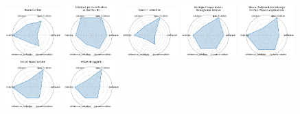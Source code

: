 \begin{figure}[ht!]
\centering
\includegraphics[width=0.1900\textwidth]{images/beam_control_radar.pdf}
\includegraphics[width=0.1900\textwidth]{images/ultrafast_jet_classification_at_the_hl-lhc_radar.pdf}
\includegraphics[width=0.1900\textwidth]{images/quench_detection_radar.pdf}
\includegraphics[width=0.1900\textwidth]{images/intelligent_experiments_through_real-time_ai_radar.pdf}
\includegraphics[width=0.1900\textwidth]{images/neural_architecture_codesign_for_fast_physics_applications_radar.pdf}
\\[1ex]
\includegraphics[width=0.1900\textwidth]{images/smart_pixels_for_lhc_radar.pdf}
\includegraphics[width=0.1900\textwidth]{images/hedm_braggnn_radar.pdf}

\end{figure}

